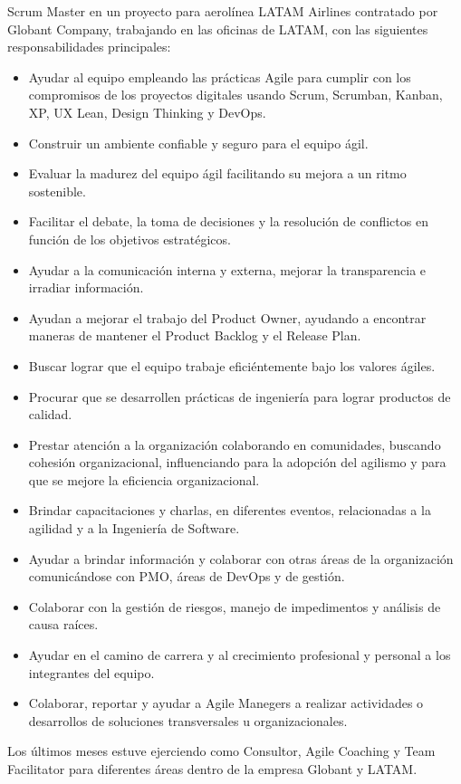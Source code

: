 \documentclass[paper=a4,fontsize=11pt]{scrartcl} %
\begin{document}
{Scrum Master en un proyecto para aerolínea LATAM Airlines contratado por Globant Company, trabajando en las oficinas de LATAM, con las siguientes responsabilidades principales:
\begin{itemize}
\item Ayudar al equipo empleando las prácticas Agile para cumplir con los compromisos de los proyectos digitales usando Scrum, Scrumban, Kanban, XP, UX Lean, Design Thinking y DevOps.
\item Construir un ambiente confiable y seguro para el equipo ágil.
\item Evaluar la madurez del equipo ágil facilitando su mejora a un ritmo sostenible.
\item Facilitar el debate, la toma de decisiones y la resolución de conflictos en función de los objetivos estratégicos.
\item Ayudar a la comunicación interna y externa, mejorar la transparencia e irradiar información.
\item Ayudan a mejorar el trabajo del Product Owner, ayudando a encontrar maneras de mantener el Product Backlog y el Release Plan.
\item Buscar lograr que el equipo trabaje eficiéntemente bajo los valores ágiles.
\item Procurar que se desarrollen prácticas de ingeniería para lograr productos de calidad.
\item Prestar atención a la organización colaborando en comunidades, buscando cohesión organizacional, influenciando para la adopción del agilismo y para que se mejore la eficiencia organizacional.
\item Brindar capacitaciones y charlas, en diferentes eventos, relacionadas a la agilidad y a la Ingeniería de Software.
\item Ayudar a brindar información y colaborar con otras áreas de la organización comunicándose con PMO, áreas de DevOps y de gestión.
\item Colaborar con la gestión de riesgos, manejo de impedimentos y análisis de causa raíces.
\item Ayudar en el camino de carrera y al crecimiento profesional y personal a los integrantes del equipo.
\item Colaborar, reportar y ayudar a Agile Manegers a realizar actividades o desarrollos de soluciones transversales u organizacionales.
\end{itemize}

Los últimos meses estuve ejerciendo como Consultor, Agile Coaching y Team Facilitator para diferentes áreas dentro de la empresa Globant y LATAM.
}
\end{document}
